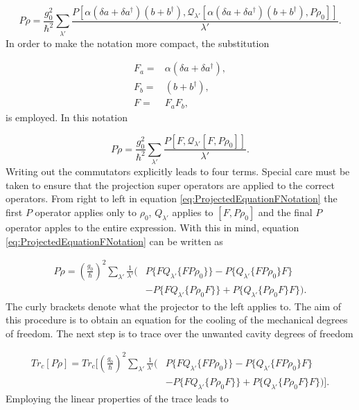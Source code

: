 \documentclass[12pt]{article}
\begin{document}
\begin{equation}
    P\dot{\rho}=\frac{g_0^2}{\hbar^2}\sum_{\lambda'} \frac{ P[ \alpha(\delta a +  \delta a^\dagger)  (b+b^\dagger),\mathcal{Q}_{\lambda'}[\alpha(\delta a +  \delta a^\dagger) (b+b^\dagger),P \rho_0]]}{\lambda'}.
\end{equation} In order to make the notation more compact, the substitution

\begin{align}
    F_a =& \alpha(\delta a + \delta a^\dagger),\\
    F_b =& (b + b^\dagger),\\
    F =& F_a F_b,
\end{align} is employed. In this notation

\begin{equation}\label{eq:ProjectedEquationFNotation}
    P\dot{\rho}=\frac{g_0^2}{\hbar^2}\sum_{\lambda'} \frac{ P[ F,\mathcal{Q}_{\lambda'}[F,P \rho_0]]}{\lambda'}.
\end{equation}  Writing out the commutators explicitly leads to four terms. Special care must be taken to ensure that the projection super operators are applied to the correct operators. From right to left in equation \eqref{eq:ProjectedEquationFNotation} the first $P$ operator applies only to $\rho_0$,  $Q_{\lambda'}$ applies to $[F,P \rho_0]$ and the final $P$ operator apples to the entire expression. With this in mind, equation \eqref{eq:ProjectedEquationFNotation} can be written as

\begin{align}
    P\dot{\rho} = (\frac{g_0 }{\hbar})^2 \sum_{\lambda'}\frac{1}{\lambda'}\Bigg(& P\{FQ_{\lambda'}\{FP\rho_0\}\}-P\{Q_{\lambda'}\{FP\rho_0\}F\}\\
    &-P\{FQ_{\lambda'}\{P\rho_0F \} \} +P\{Q_{\lambda'}\{P\rho_0 F\}F\} \Bigg). \nonumber
\end{align} The curly brackets denote what the projector to the left applies to. The aim of this procedure is to obtain an equation for the cooling of the mechanical degrees of freedom. The next step is to trace over the unwanted cavity degrees of freedom

\begin{align}
   Tr_c[P\dot{\rho}] = Tr_c[(\frac{g_0 }{\hbar})^2 \sum_{\lambda'}\frac{1}{\lambda'}\Bigg(& P\{FQ_{\lambda'}\{FP\rho_0\}\}-P\{Q_{\lambda'}\{FP\rho_0\}F\}\\
    &-P\{FQ_{\lambda'}\{P\rho_0F \} \} +P\{Q_{\lambda'}\{P\rho_0 F\}F\} \Bigg)].\nonumber
\end{align}  Employing the linear properties of the trace leads to
\end{document}
